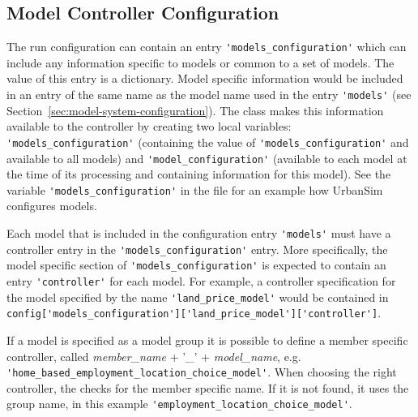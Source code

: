 \subsection{Model Controller Configuration}
\label{sec:models-configuration}
\label{sec:model-controller-configuration}
%
The run configuration can contain an entry \verb|'models_configuration'| which can
include any information specific to models or common to a set of models. The
value of this entry is a dictionary.  Model specific information would be
included in an entry of the same name as the model name used in the entry
\verb|'models'| (see Section~\ref{sec:model-system-configuration}). The
 class makes this information available to the controller
by creating two local variables: \verb|'models_configuration'| (containing the
value of \verb|'models_configuration'| and available to all models) and
\verb|'model_configuration'| (available to each model at the time of its
processing and containing information for this model). See the variable
\verb|'models_configuration'| in the file  for an
example how UrbanSim configures models. 

Each model that is included in the configuration entry \verb|'models'| must have a
controller entry in the \verb|'models_configuration'| entry.  More specifically, the model specific
section of \verb|'models_configuration'| is expected to contain an entry \verb|'controller'|
for each model. For example, a controller specification for the model
specified by the name \verb|'land_price_model'| would be contained in\\
\verb|config['models_configuration']['land_price_model']['controller']|.

If a model is specified as a model group  it is possible to define a member specific controller, called 
{\em member_name} + '_' + {\em model_name}, e.g. \verb|'home_based_employment_location_choice_model'|.
When choosing the right controller, the  checks for the member specific name. If it is not found,
it uses the group name, in this example \verb|'employment_location_choice_model'|.

